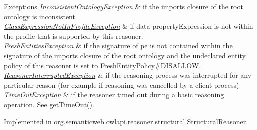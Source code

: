 \begin{DoxyExceptions}{Exceptions}
{\em \hyperlink{classorg_1_1semanticweb_1_1owlapi_1_1reasoner_1_1_inconsistent_ontology_exception}{Inconsistent\-Ontology\-Exception}} & if the imports closure of the root ontology is inconsistent \\
\hline
{\em \hyperlink{classorg_1_1semanticweb_1_1owlapi_1_1reasoner_1_1_class_expression_not_in_profile_exception}{Class\-Expression\-Not\-In\-Profile\-Exception}} & if {\ttfamily data property\-Expression} is not within the profile that is supported by this reasoner. \\
\hline
{\em \hyperlink{classorg_1_1semanticweb_1_1owlapi_1_1reasoner_1_1_fresh_entities_exception}{Fresh\-Entities\-Exception}} & if the signature of {\ttfamily pe} is not contained within the signature of the imports closure of the root ontology and the undeclared entity policy of this reasoner is set to \hyperlink{enumorg_1_1semanticweb_1_1owlapi_1_1reasoner_1_1_fresh_entity_policy_a762eae6d5b2449d125311ecaabfdc8d0}{Fresh\-Entity\-Policy\#\-D\-I\-S\-A\-L\-L\-O\-W}. \\
\hline
{\em \hyperlink{classorg_1_1semanticweb_1_1owlapi_1_1reasoner_1_1_reasoner_interrupted_exception}{Reasoner\-Interrupted\-Exception}} & if the reasoning process was interrupted for any particular reason (for example if reasoning was cancelled by a client process) \\
\hline
{\em \hyperlink{classorg_1_1semanticweb_1_1owlapi_1_1reasoner_1_1_time_out_exception}{Time\-Out\-Exception}} & if the reasoner timed out during a basic reasoning operation. See \hyperlink{interfaceorg_1_1semanticweb_1_1owlapi_1_1reasoner_1_1_o_w_l_reasoner_a44b2c968f989afe5290db29c90faa164}{get\-Time\-Out()}. \\
\hline
\end{DoxyExceptions}


Implemented in \hyperlink{classorg_1_1semanticweb_1_1owlapi_1_1reasoner_1_1structural_1_1_structural_reasoner_af698a29d193b79311d9de084349dde9c}{org.\-semanticweb.\-owlapi.\-reasoner.\-structural.\-Structural\-Reasoner}.

